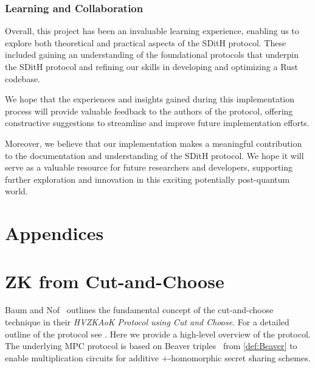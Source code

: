 \documentclass[11pt]{report}
\theoremstyle{definition}
\theoremstyle{plain}
\begin{document}
\subsubsection{Learning and Collaboration}
Overall, this project has been an invaluable learning experience, enabling us to explore both theoretical and practical aspects of the SDitH protocol. These included gaining an understanding of the foundational protocols that underpin the SDitH protocol and refining our skills in developing and optimizing a Rust codebase.

We hope that the experiences and insights gained during this implementation process will provide valuable feedback to the authors of the protocol, offering constructive suggestions to streamline and improve future implementation efforts.

Moreover, we believe that our implementation makes a meaningful contribution to the documentation and understanding of the SDitH protocol. We hope it will serve as a valuable resource for future researchers and developers, supporting further exploration and innovation in this exciting potentially post-quantum world.



\cleardoublepage
{}




\cleardoublepage

\appendix
\section*{Appendices}
\renewcommand{\thesection}{\Alph{section}}

\section{ZK from Cut-and-Choose}\label{sec:zk-cut-and-choose}

Baum and Nof~\cite{baum2020concretely} outlines the fundamental concept of the cut-and-choose technique in their \textit{HVZKAoK Protocol using Cut and Choose}. For a detailed outline of the protocol see \cite[s3.2]{baum2020concretely}. Here we provide a high-level overview of the protocol. The underlying MPC protocol is based on Beaver triples~\cite{Beaver1992efficient} from \autoref{def:Beaver} to enable multiplication circuits for additive $+$-homomorphic secret sharing schemes.
\end{document}
